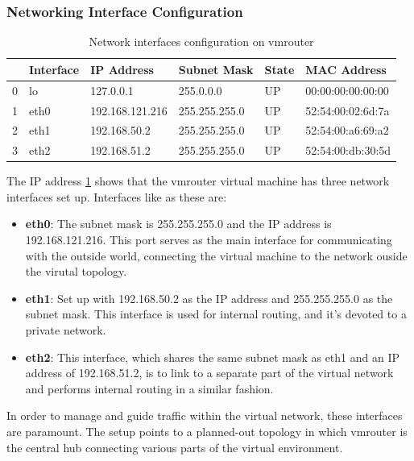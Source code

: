 \documentclass[12pt, fleqn, a4paper]{article}
\begin{document}
\subsubsection{Networking Interface Configuration}
\begin{table}[H]
	\caption{Network interfaces configuration on vmrouter}
	\centering
  \begin{tabular}{llllll}
\toprule
{} & Interface &       IP Address &    Subnet Mask & State &        MAC Address \\
\midrule
0 &        lo &        127.0.0.1 &      255.0.0.0 &    UP &  00:00:00:00:00:00 \\
1 &      eth0 &  192.168.121.216 &  255.255.255.0 &    UP &  52:54:00:02:6d:7a \\
2 &      eth1 &     192.168.50.2 &  255.255.255.0 &    UP &  52:54:00:a6:69:a2 \\
3 &      eth2 &     192.168.51.2 &  255.255.255.0 &    UP &  52:54:00:db:30:5d \\
\bottomrule
\end{tabular}
  \label{tab:vmrouter1}
\end{table}
The IP address \cref{tab:vmrouter1} shows that the vmrouter virtual machine has three network interfaces set up. Interfaces like as these are:
\begin{itemize}
  \item \textbf{eth0}: The subnet mask is 255.255.255.0 and the IP address is 192.168.121.216. This port serves as the main interface for communicating with the outside world, connecting the virtual machine to the network ouside the virutal topology.
  \item \textbf{eth1}: Set up with 192.168.50.2 as the IP address and 255.255.255.0 as the subnet mask. This interface is used for internal routing, and it's devoted to a private network.
  \item \textbf{eth2}: This interface, which shares the same subnet mask as eth1 and an IP address of 192.168.51.2, is to link to a separate part of the virtual network and performs internal routing in a similar fashion.
\end{itemize}
In order to manage and guide traffic within the virtual network, these interfaces are paramount. The setup points to a planned-out topology in which vmrouter is the central hub connecting various parts of the virtual environment.
\end{document}
